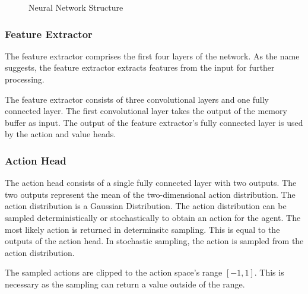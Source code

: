 \begin{figure}[!h]
    \caption{Neural Network Structure}
    \label{fig:network_structure}
\end{figure}

\subsubsection{Feature Extractor}

The feature extractor comprises the first four layers of the network. As the name suggests, the feature extractor extracts features from the input for further processing.

The feature extractor consists of three convolutional layers and one fully connected layer. The first convolutional layer takes the output of the memory buffer as input. The output of the feature extractor's fully connected layer is used by the action and value heads.


\subsubsection{Action Head}
\label{sec:action_sampling}

The action head consists of a single fully connected layer with two outputs. The two outputs represent the mean of the two-dimensional action distribution. The action distribution is a Gaussian Distribution. The action distribution can be sampled deterministically or stochastically to obtain an action for the agent. The most likely action is returned in determinsitc sampling. This is equal to the outputs of the action head. In stochastic sampling, the action is sampled from the action distribution.

The sampled actions are clipped to the action space's range $[-1,1]$. This is necessary as the sampling can return a value outside of the range.

